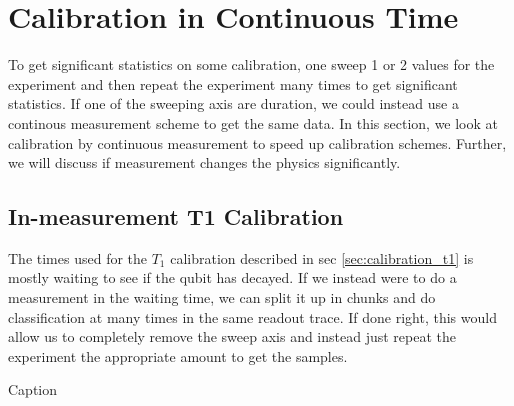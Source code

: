 \section{Calibration in Continuous Time}
To get significant statistics on some calibration, one sweep 1 or 2 values for the experiment and then repeat the experiment many times to get significant statistics. If one of the sweeping axis are duration, we could instead use a continous measurement scheme to get the same data. In this section, we look at calibration by continuous measurement to speed up calibration schemes. Further, we will discuss if measurement changes the physics significantly. 

\subsection{In-measurement T1 Calibration}
The times used for the $T_1$ calibration described in sec \ref{sec:calibration_t1} is mostly waiting to see if the qubit has decayed. If we instead were to do a measurement in the waiting time, we can split it up in chunks and do classification at many times in the same readout trace. If done right, this would allow us to completely remove the sweep axis and instead just repeat the experiment the appropriate amount to get the samples.

\begin{marginfigure}[-2cm]
    \centering
    \caption{Caption}
    \label{fig:inmeasurementt1circuit}
\end{marginfigure}

